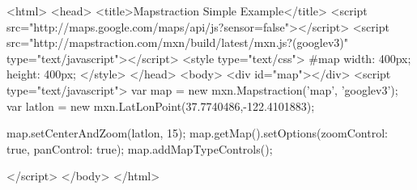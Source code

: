<html>
<head>
   	<title>Mapstraction Simple Example</title>
   	<script src="http://maps.google.com/maps/api/js?sensor=false"></script>
   	<script src="http://mapstraction.com/mxn/build/latest/mxn.js?(googlev3)" type="text/javascript"></script>
	<style type="text/css">
	#map {
		width: 400px;
		height: 400px;
	}
	</style>
</head>
<body>
	<div id="map"></div>
	<script type="text/javascript">
		var map = new mxn.Mapstraction('map', 'googlev3'); 
		var latlon = new mxn.LatLonPoint(37.7740486,-122.4101883);

		map.setCenterAndZoom(latlon, 15);
		map.getMap().setOptions({zoomControl: true, panControl: true});
		map.addMapTypeControls();
		
	</script>
</body>
</html>	